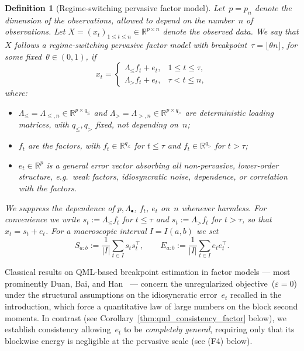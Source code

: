 \documentclass[10pt, letterpaper]{amsart}
\def\R{{\mathbb{R}}}
\newtheorem{defn}[theorem]{Definition}
\begin{document}
\begin{defn}[Regime-switching pervasive factor model]\label{def:pervasive_factor_model}
Let~$p=p_n$ denote the dimension of the observations, allowed to depend on the number~$n$ of observations. Let $X=(x_t)_{1\le t\le n}\in \R^{p\times n}$ denote the observed data. We say that $X$ follows a regime-switching pervasive factor model with breakpoint~$\tau = \lfloor \theta n\rfloor$, for some fixed~$\theta \in (0,1)$, if
\begin{equation}\label{eq:factor_model_controlled_error}
x_t=
\begin{cases}
\Lambda_{\le} f_t + e_t, & 1\le t\le \tau,\\[1mm]
\Lambda_{>} f_t + e_t, & \tau < t\le n,
\end{cases}
\end{equation}
where:
\begin{itemize}
    \item $\Lambda_{\le}=\Lambda_{\le,n}\in \R^{p\times q_{\le}}$ and $\Lambda_{>}=\Lambda_{>,n}\in \R^{p\times q_{>}}$ are deterministic loading matrices, with $q_{\le},q_{>}$ fixed, not depending on~$n$;
    \item $f_t$ are the factors, with $f_t \in \R^{q_\le}$ for $t\le\tau$ and $f_t\in\R^{q_>}$ for $t>\tau$;
    \item $e_t\in \R^p$ is a general error vector absorbing all non-pervasive, lower-order structure, e.g.~weak factors, idiosyncratic noise, dependence, or correlation with the factors.
\end{itemize}
We suppress the dependence of $p, \Lambda_\bullet$, $f_t$, $e_t$ on~$n$ whenever harmless. For convenience we write $s_t:=\Lambda_{\le} f_t$ for $t\le\tau$ and $s_t:=\Lambda_{>} f_t$ for $t>\tau$, so that $x_t=s_t+e_t$. For a macroscopic interval $I=I(a,b)$ we set
\[
S_{a:b}:=\frac1{|I|}\sum_{t\in I}s_ts_t^{\top},
\qquad
E_{a:b}:=\frac1{|I|}\sum_{t\in I}e_te_t^{\top}.
\]

\end{defn}

Classical results on QML-based breakpoint estimation in factor models --- most prominently Duan, Bai, and Han~\cite{DuanBaiHan2023} --- concern the unregularized objective~($\varepsilon=0$) under the structural assumptions on the idiosyncratic error~$e_t$ recalled in the introduction, which force a quantitative law of large numbers on the block second moments. In contrast (see Corollary~\ref{thm:qml_consistency_factor} below), we establish consistency allowing~$e_t$ to be \emph{completely general}, requiring only that its blockwise energy is negligible at the pervasive scale (see (F4) below). \\
\end{document}
